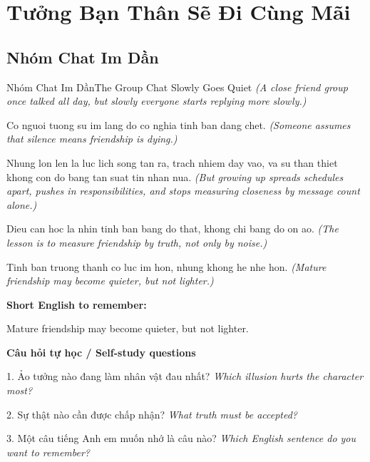 \chapter{Tưởng Bạn Thân Sẽ Đi Cùng Mãi}

\section{Nhóm Chat Im Dần}
\begin{truyen}{Nhóm Chat Im Dần}{The Group Chat Slowly Goes Quiet}
\textit{(A close friend group once talked all day, but slowly everyone starts replying more slowly.)}

Co nguoi tuong su im lang do co nghia tinh ban dang chet.
\textit{(Someone assumes that silence means friendship is dying.)}

Nhung lon len la luc lich song tan ra, trach nhiem day vao, va su than thiet khong con do bang tan suat tin nhan nua.
\textit{(But growing up spreads schedules apart, pushes in responsibilities, and stops measuring closeness by message count alone.)}

Dieu can hoc la nhin tinh ban bang do that, khong chi bang do on ao.
\textit{(The lesson is to measure friendship by truth, not only by noise.)}

\end{truyen}

\begin{baihoc}
Tinh ban truong thanh co luc im hon, nhung khong he nhe hon.
\textit{(Mature friendship may become quieter, but not lighter.)}
\end{baihoc}

\begin{ghinhoanh}
\textbf{Short English to remember:}

Mature friendship may become quieter, but not lighter.

\end{ghinhoanh}

\begin{tuhocnhanh}
\textbf{Câu hỏi tự học / Self-study questions}

1. Ảo tưởng nào đang làm nhân vật đau nhất? \textit{Which illusion hurts the character most?}

2. Sự thật nào cần được chấp nhận? \textit{What truth must be accepted?}

3. Một câu tiếng Anh em muốn nhớ là câu nào? \textit{Which English sentence do you want to remember?}
\end{tuhocnhanh}
\ngancach

